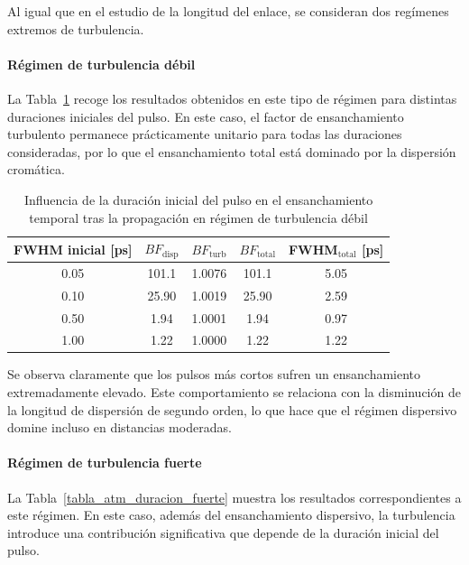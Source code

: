 Al igual que en el estudio de la longitud del enlace, se consideran dos regímenes extremos de turbulencia. 

\paragraph{Régimen de turbulencia débil}
La Tabla~\ref{tabla_atm_duracion_debil} recoge los resultados obtenidos en este tipo de régimen para distintas duraciones iniciales del pulso. En este caso, el factor de ensanchamiento turbulento permanece prácticamente unitario para todas las duraciones consideradas, por lo que el ensanchamiento total está dominado por la dispersión cromática.


\begin{table}[H]
\centering
\hspace*{-0.6cm}
\renewcommand{\arraystretch}{1.2}
\begin{tabular}{|c|c|c|c|c|}
\hline
\textbf{FWHM inicial [ps]} & \textbf{$BF_{\mathrm{disp}}$} & \textbf{$BF_{\mathrm{turb}}$} & \textbf{$BF_{\mathrm{total}}$} & \textbf{FWHM$_{\mathrm{total}}$ [ps]} \\
\hline
0.05 & 101.1 & 1.0076 & 101.1 & 5.05 \\
0.10 & 25.90 & 1.0019 & 25.90 & 2.59 \\
0.50 & 1.94 & 1.0001 & 1.94 & 0.97 \\
1.00 & 1.22 & 1.0000 & 1.22 & 1.22 \\
\hline
\end{tabular}
\caption{Influencia de la duración inicial del pulso en el ensanchamiento temporal tras la propagación en régimen de turbulencia débil}
\label{tabla_atm_duracion_debil}
\end{table}

Se observa claramente que los pulsos más cortos sufren un ensanchamiento extremadamente elevado. Este comportamiento se relaciona con la disminución de la longitud de dispersión de segundo orden, lo que hace que el régimen dispersivo domine incluso en distancias moderadas.

\paragraph{Régimen de turbulencia fuerte}
La Tabla~\ref{tabla_atm_duracion_fuerte} muestra los resultados correspondientes a este régimen. En este caso, además del ensanchamiento dispersivo, la turbulencia introduce una contribución significativa que depende de la duración inicial del pulso.

